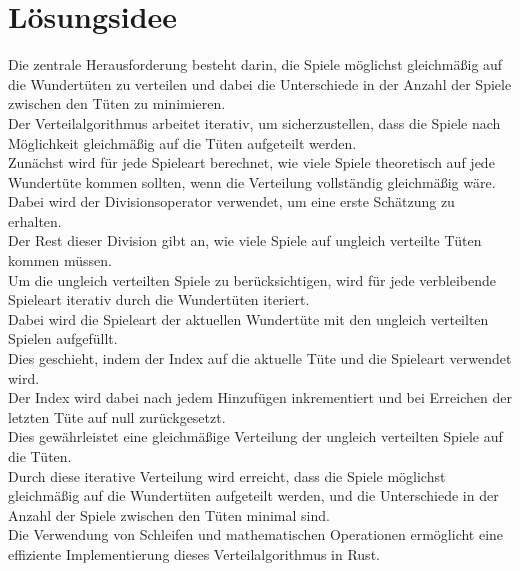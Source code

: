 \section{Lösungsidee}\label{sec:idea}
\begin{flushleft}
Die zentrale Herausforderung besteht darin, die Spiele möglichst gleichmäßig auf die Wundertüten zu verteilen
und dabei die Unterschiede in der Anzahl der Spiele zwischen den Tüten zu minimieren.
\linebreak
\\
Der Verteilalgorithmus arbeitet iterativ, um sicherzustellen, dass die Spiele nach Möglichkeit gleichmäßig auf die Tüten aufgeteilt werden.
\linebreak
\\

Zunächst wird für jede Spieleart berechnet, wie viele Spiele theoretisch auf jede Wundertüte kommen sollten, 
wenn die Verteilung vollständig gleichmäßig wäre. Dabei wird der Divisionsoperator verwendet, um eine erste Schätzung zu erhalten.
\linebreak
\\
Der Rest dieser Division gibt an, wie viele Spiele auf ungleich verteilte Tüten kommen müssen.\\

Um die ungleich verteilten Spiele zu berücksichtigen, wird für jede verbleibende Spieleart iterativ durch die Wundertüten iteriert.\\
Dabei wird die Spieleart der aktuellen Wundertüte mit den ungleich verteilten Spielen aufgefüllt.\\
Dies geschieht, indem der Index auf die aktuelle Tüte und die Spieleart verwendet wird.\\
Der Index wird dabei nach jedem Hinzufügen inkrementiert und bei Erreichen der letzten Tüte auf null zurückgesetzt.\\
Dies gewährleistet eine gleichmäßige Verteilung der ungleich verteilten Spiele auf die Tüten.
\linebreak
\\
Durch diese iterative Verteilung wird erreicht, dass die Spiele möglichst gleichmäßig auf die Wundertüten aufgeteilt werden, 
und die Unterschiede in der Anzahl der Spiele zwischen den Tüten minimal sind.\\
Die Verwendung von Schleifen und mathematischen Operationen ermöglicht eine effiziente Implementierung dieses Verteilalgorithmus in Rust.
\end{flushleft}

